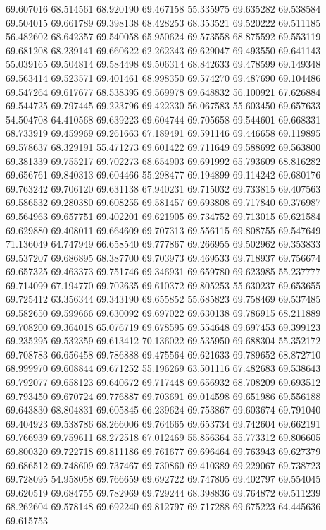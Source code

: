 69.607016
68.514561
68.920190
69.467158
55.335975
69.635282
69.538584
69.504015
69.661789
69.398138
68.428253
68.353521
69.520222
69.511185
56.482602
68.642357
69.540058
65.950624
69.573558
68.875592
69.553119
69.681208
68.239141
69.660622
62.262343
69.629047
69.493550
69.641143
55.039165
69.504814
69.584498
69.506314
68.842633
69.478599
69.149348
69.563414
69.523571
69.401461
68.998350
69.574270
69.487690
69.104486
69.547264
69.617677
68.538395
69.569978
69.648832
56.100921
67.626884
69.544725
69.797445
69.223796
69.422330
56.067583
55.603450
69.657633
54.504708
64.410568
69.639223
69.604744
69.705658
69.544601
69.668331
68.733919
69.459969
69.261663
67.189491
69.591146
69.446658
69.119895
69.578637
68.329191
55.471273
69.601422
69.711649
69.588692
69.563800
69.381339
69.755217
69.702273
68.654903
69.691992
65.793609
68.816282
69.656761
69.840313
69.604466
55.298477
69.194899
69.114242
69.680176
69.763242
69.706120
69.631138
67.940231
69.715032
69.733815
69.407563
69.586532
69.280380
69.608255
69.581457
69.693808
69.717840
69.376987
69.564963
69.657751
69.402201
69.621905
69.734752
69.713015
69.621584
69.629880
69.408011
69.664609
69.707313
69.556115
69.808755
69.547649
71.136049
64.747949
66.658540
69.777867
69.266955
69.502962
69.353833
69.537207
69.686895
68.387700
69.703973
69.469533
69.718937
69.756674
69.657325
69.463373
69.751746
69.346931
69.659780
69.623985
55.237777
69.714099
67.194770
69.702635
69.610372
69.805253
55.630237
69.653655
69.725412
63.356344
69.343190
69.655852
55.685823
69.758469
69.537485
69.582650
69.599666
69.630092
69.697022
69.630138
69.786915
68.211889
69.708200
69.364018
65.076719
69.678595
69.554648
69.697453
69.399123
69.235295
69.532359
69.613412
70.136022
69.535950
69.688304
55.352172
69.708783
66.656458
69.786888
69.475564
69.621633
69.789652
68.872710
68.999970
69.608844
69.671252
55.196269
63.501116
67.482683
69.538643
69.792077
69.658123
69.640672
69.717448
69.656932
68.708209
69.693512
69.793450
69.670724
69.776887
69.703691
69.014598
69.651986
69.556188
69.643830
68.804831
69.605845
66.239624
69.753867
69.603674
69.791040
69.404923
69.538786
68.266006
69.764665
69.653734
69.742604
69.662191
69.766939
69.759611
68.272518
67.012469
55.856364
55.773312
69.806605
69.800320
69.722718
69.811186
69.761677
69.696464
69.763943
69.627379
69.686512
69.748609
69.737467
69.730860
69.410389
69.229067
69.738723
69.728095
54.958058
69.766659
69.692722
69.747805
69.402797
69.554045
69.620519
69.684755
69.782969
69.729244
68.398836
69.764872
69.511239
68.262604
69.578148
69.692240
69.812797
69.717288
69.675223
64.445636
69.615753
